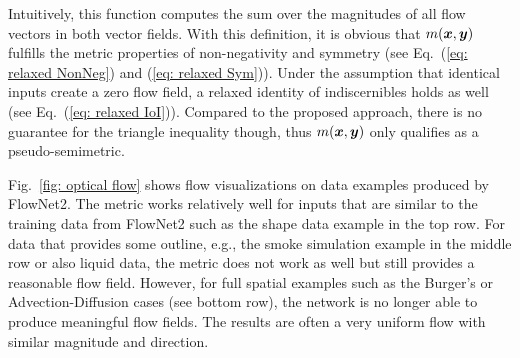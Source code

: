 Intuitively, this function computes the sum over the magnitudes of all flow vectors in both vector fields. With this definition, it is obvious that $m({\bm{x}},{\bm{y}})$ fulfills the metric properties of non-negativity and symmetry (see Eq.~(\ref{eq: relaxed NonNeg}) and (\ref{eq: relaxed Sym})). Under the assumption that identical inputs create a zero flow field, a relaxed identity of indiscernibles holds as well (see Eq.~(\ref{eq: relaxed IoI})). Compared to the proposed approach, there is no guarantee for the triangle inequality though, thus $m({\bm{x}},{\bm{y}})$ only qualifies as a pseudo-semimetric.

Fig.~\ref{fig: optical flow} shows flow visualizations on data examples produced by FlowNet2. The metric works relatively well for inputs that are similar to the training data from FlowNet2 such as the shape data example in the top row. For data that provides some outline, e.g., the smoke simulation example in the middle row or also liquid data, the metric does not work as well but still provides a reasonable flow field. However, for full spatial examples such as the Burger's or Advection-Diffusion cases (see bottom row), the network is no longer able to produce meaningful flow fields. The results are often a very uniform flow with similar magnitude and direction.



